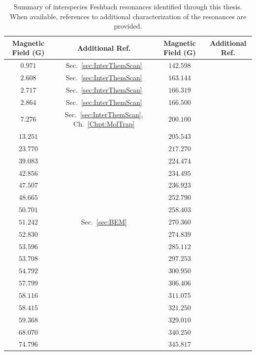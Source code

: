 \begin{table}[p]
	\caption{Summary of interspecies Feshbach resonances identified through this thesis. When available, references to additional characterization of the resonances are provided.}
	\begin{center}
		\begin{tabular}{cc|cc}
			\hline
			\hline
			Magnetic Field (G) \qquad & Additional Ref. & Magnetic Field (G) \qquad & Additional Ref.\\
			\hline
			$0.971$ & Sec.~\ref{sec:InterThemScan}  & $142.598$ & \\
			$2.608$ & Sec.~\ref{sec:InterThemScan}  & $163.144$ & \\
			$2.717$ &  Sec.~\ref{sec:InterThemScan} & $166.319$ & \\
			$2.864$ &  Sec.~\ref{sec:InterThemScan} & $166.500$ & \\
			$7.276$ & Sec.~\ref{sec:InterThemScan}, Ch.~\ref{Chpt:MolTrap}& $200.100$ & \\
			$13.251$ & & $205.543$ & \cite{Ravensbergen2020rif} \\
			$23.770$ & & $217.270$ & \cite{Ravensbergen2020rif} \\
			$39.083$ & & $224.474$ & \cite{Ravensbergen2020rif} \\
			$42.856$ & & $234.495$ & \cite{Ravensbergen2020rif} \\
			$47.507$ & & $236.923$ & \cite{Ravensbergen2020rif} \\
			$48.665$ & & $252.790$ & \cite{Ravensbergen2020rif} \\
			$50.701$ & & $258.403$ & \\
			$51.242$ & Sec.~\ref{sec:BEM} & $270.360$ & \\
			$52.830$ & \cite{Soave2022PhD} & $274.839$ & \\
			$53.596$ & & $285.112$ & \\
			$53.708$ & & $297.253$ & \\
			$54.792$ & \cite{Soave2022PhD} & $300.950$  & \\
			$57.799$ & \cite{Soave2022PhD} & $306.406$ & \\
			$58.116$ & & $311.075$ & \\
			$58.415$ & \cite{Soave2022PhD} & $321.250$  & \\
			$59.368$ & & $329.010$  & \\
			$68.070$ & & $340.250$ & \\
			$74.796$ & & $345.817$ & \\
			\hline
			\hline
		\end{tabular}
	\end{center}
	
	\label{tab:AllFeshbach}
\end{table}

